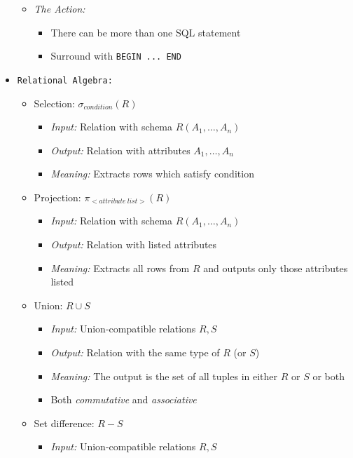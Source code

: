 \documentclass[landscape,8pt]{extarticle}
\newcommand{\code}{\lstinline}
\begin{document}
\begin{multicols}{4}
\begin{itemize}
\begin{itemize}
        \item \emph{The Action:}
        \begin{itemize}
            \item There can be more than one SQL statement
            \item Surround with \code{BEGIN ... END}
        \end{itemize}
    \end{itemize}
    \item \code{Relational Algebra:}
    \begin{itemize}
        \item Selection: $\sigma_{condition}(R)$
        \begin{itemize}
            \item \emph{Input:} Relation with schema $R(A_1, \dots, A_n)$
            \item \emph{Output:} Relation with attributes $A_1, \dots, A_n$
            \item \emph{Meaning:} Extracts rows which satisfy condition
        \end{itemize}
        \item Projection: $\pi_{<attribute\ list>}(R)$
        \begin{itemize}
            \item \emph{Input:} Relation with schema $R(A_1, \dots, A_n)$
            \item \emph{Output:} Relation with listed attributes
            \item \emph{Meaning:} Extracts all rows from $R$ and outputs only those attributes listed
        \end{itemize}
            \item Union: $R \cup S$
            \begin{itemize}
                \item \emph{Input:} Union-compatible relations $R,S$
                \item \emph{Output:} Relation with the same type of $R$ (or $S$)
                \item \emph{Meaning:} The output is the set of all tuples in either $R$ or $S$ or
                both
                \item Both \emph{commutative} and \emph{associative}
            \end{itemize}
            \item Set difference: $R - S$
            \begin{itemize}
                \item \emph{Input:} Union-compatible relations $R,S$

\end{itemize}
\end{itemize}
\end{itemize}
\end{multicols}
\end{document}
